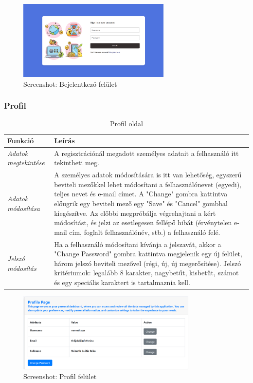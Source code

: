 \begin{figure}[H]
	\centering
	\includegraphics[height=150px]{img/login}
	\caption{Screenshot: Bejelentkező felület}
	\label{fig:login}
\end{figure}

\subsubsection{Profil}
\begin{table}[H]
	\centering
	\begin{tabular}{ | m{} | m{} | }
		\hline
		\textbf{Funkció} & \textbf{Leírás} \\
		\hline \hline
		\emph{Adatok megtekintése} & A regisztrációnál megadott személyes adatait a felhasználó itt tekintheti meg. \\
		\hline
		\emph{Adatok módosítása} &  A személyes adatok módosítására is itt van lehetőség, egyszerű beviteli mezőkkel lehet módosítani a felhasználónevet (egyedi), teljes nevet és e-mail címet. A "Change" gombra kattintva előugrik egy beviteli mező egy "Save" és "Cancel" gombbal kiegészítve. Az előbbi megpróbálja végrehajtani a kért módosítást, és jelzi az esetlegesen fellépő hibát (érvénytelen e-mail cím, foglalt felhasználónév, stb.) a felhasználó felé.  \\
		\hline
		\emph{Jelszó módosítás} & Ha a felhasználó módosítani kívánja a jelszavát, akkor a "Change Password" gombra kattintva megjelenik egy új felület, három jelszó beviteli mezővel (régi, új, új megerősítése). Jelszó kritériumok: legalább 8 karakter, nagybetűt, kisbetűt, számot és egy speciális karaktert is tartalmaznia kell. \\
		\hline
	\end{tabular}
	\caption{Profil oldal}
	\label{tab:profile}
\end{table}

\begin{figure}[H]
	\centering
	\includegraphics[height=150px]{img/profile}
	\caption{Screenshot: Profil felület}
	\label{fig:profile}
\end{figure}

